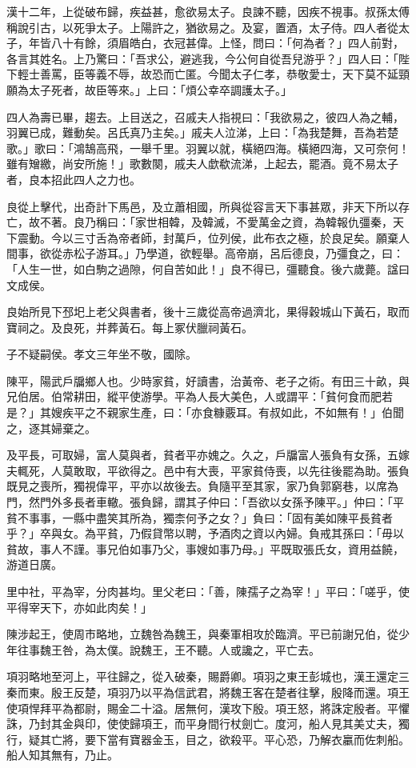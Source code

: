 \begin{pinyinscope}
漢十二年，上從破布歸，疾益甚，愈欲易太子。良諫不聽，因疾不視事。叔孫太傅稱說引古，以死爭太子。上陽許之，猶欲易之。及宴，置酒，太子侍。四人者從太子，年皆八十有餘，須眉皓白，衣冠甚偉。上怪，問曰：「何為者？」四人前對，各言其姓名。上乃驚曰：「吾求公，避逃我，今公何自從吾兒游乎？」四人曰：「陛下輕士善罵，臣等義不辱，故恐而亡匿。今聞太子仁孝，恭敬愛士，天下莫不延頸願為太子死者，故臣等來。」上曰：「煩公幸卒調護太子。」

四人為壽已畢，趨去。上目送之，召戚夫人指視曰：「我欲易之，彼四人為之輔，羽翼已成，難動矣。呂氏真乃主矣。」戚夫人泣涕，上曰：「為我楚舞，吾為若楚歌。」歌曰：「鴻鵠高飛，一舉千里。羽翼以就，橫絕四海。橫絕四海，又可奈何！雖有矰繳，尚安所施！」歌數闋，戚夫人歔欷流涕，上起去，罷酒。竟不易太子者，良本招此四人之力也。

良從上擊代，出奇計下馬邑，及立蕭相國，所與從容言天下事甚眾，非天下所以存亡，故不著。良乃稱曰：「家世相韓，及韓滅，不愛萬金之資，為韓報仇彊秦，天下震動。今以三寸舌為帝者師，封萬戶，位列侯，此布衣之極，於良足矣。願棄人間事，欲從赤松子游耳。」乃學道，欲輕舉。高帝崩，呂后德良，乃彊食之，曰：「人生一世，如白駒之過隙，何自苦如此！」良不得已，彊聽食。後六歲薨。諡曰文成侯。

良始所見下邳圯上老父與書者，後十三歲從高帝過濟北，果得穀城山下黃石，取而寶祠之。及良死，并葬黃石。每上冢伏臘祠黃石。

子不疑嗣侯。孝文三年坐不敬，國除。

陳平，陽武戶牖鄉人也。少時家貧，好讀書，治黃帝、老子之術。有田三十畝，與兄伯居。伯常耕田，縱平使游學。平為人長大美色，人或謂平：「貧何食而肥若是？」其嫂疾平之不親家生產，曰：「亦食糠覈耳。有叔如此，不如無有！」伯聞之，逐其婦棄之。

及平長，可取婦，富人莫與者，貧者平亦媿之。久之，戶牖富人張負有女孫，五嫁夫輒死，人莫敢取，平欲得之。邑中有大喪，平家貧侍喪，以先往後罷為助。張負既見之喪所，獨視偉平，平亦以故後去。負隨平至其家，家乃負郭窮巷，以席為門，然門外多長者車轍。張負歸，謂其子仲曰：「吾欲以女孫予陳平。」仲曰：「平貧不事事，一縣中盡笑其所為，獨柰何予之女？」負曰：「固有美如陳平長貧者乎？」卒與女。為平貧，乃假貸幣以聘，予酒肉之資以內婦。負戒其孫曰：「毋以貧故，事人不謹。事兄伯如事乃父，事嫂如事乃母。」平既取張氏女，資用益饒，游道日廣。

里中社，平為宰，分肉甚均。里父老曰：「善，陳孺子之為宰！」平曰：「嗟乎，使平得宰天下，亦如此肉矣！」

陳涉起王，使周市略地，立魏咎為魏王，與秦軍相攻於臨濟。平已前謝兄伯，從少年往事魏王咎，為太僕。說魏王，王不聽。人或讒之，平亡去。

項羽略地至河上，平往歸之，從入破秦，賜爵卿。項羽之東王彭城也，漢王還定三秦而東。殷王反楚，項羽乃以平為信武君，將魏王客在楚者往擊，殷降而還。項王使項悍拜平為都尉，賜金二十溢。居無何，漢攻下殷。項王怒，將誅定殷者。平懼誅，乃封其金與印，使使歸項王，而平身間行杖劍亡。度河，船人見其美丈夫，獨行，疑其亡將，要下當有寶器金玉，目之，欲殺平。平心恐，乃解衣臝而佐刺船。船人知其無有，乃止。


\end{pinyinscope}
